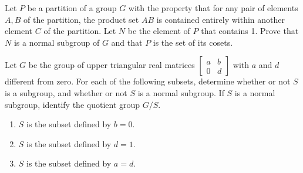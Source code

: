 \documentclass[10pt]{article}
\begin{document}
\begin{problem}
	Let \( P \) be a partition of a group \( G \) with the property that for any pair of elements \( A, B \)
	of the partition, the product set \( AB \) is contained entirely within another element \( C \) of the
	partition. Let \( N \) be the element of \( P \) that contains 1. Prove that \( N \) is a normal subgroup
	of \( G \) and that \( P \) is the set of its cosets. 
\end{problem}


\begin{problem}
	Let \( G \) be the group of upper triangular real matrices 
	\( \begin{bmatrix} a & b \\ 0 & d \end{bmatrix}  \) with 
	\( a \) and \( d \) different from zero. For each of the following subsets, 
	determine whether or not  \( S \) is a subgroup, and whether or not 
	\( S \) is a normal subgroup. If \( S \) is a normal subgroup, identify the 
	quotient group \( G / S \). 
	\begin{enumerate}[label=\roman*)]
		\item \( S \) is the subset defined by \( b = 0 \). 
		\item \( S \) is the subset defined by \( d = 1 \).
		\item \( S \) is the subset defined by \( a = d \). 
	\end{enumerate}
\end{problem}
\end{document}
